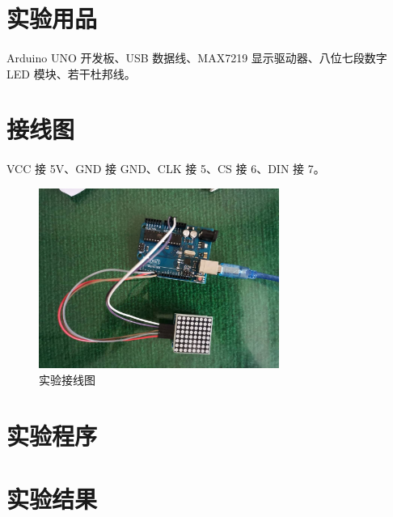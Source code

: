 \documentclass[UTF8, oneside]{ctexbook}
\begin{document}
\section{实验用品}
\paragraph{}
Arduino UNO 开发板、USB 数据线、MAX7219 显示驱动器、八位七段数字 LED 模块、若干杜邦线。

\section{接线图}
\paragraph{}
VCC 接 5V、GND 接 GND、CLK 接 5、CS 接 6、DIN 接 7。
\begin{figure}[h]
    \centering
    \includegraphics[width=0.7\textwidth]{./result/sensor/2/lines.jpg}
    \caption{实验接线图}
    \label{s2_line}
\end{figure}

\section{实验程序}


\section{实验结果}
\end{document}
